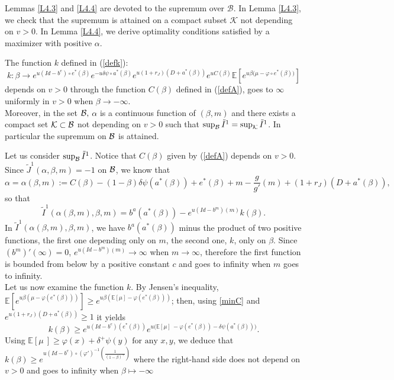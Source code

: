 \documentclass{svjour3}
\begin{document}
\noindent Lemmas \ref{L4.3} and \ref{L4.4} are devoted to the supremum over $\mathcal{B}$. In Lemma  \ref{L4.3}, we check that the supremum is attained on a compact subset $\mathcal{K}$ not depending on $v>0$. In Lemma \ref{L4.4}, we derive optimality  conditions satisfied by a maximizer with positive $\alpha$. 
\begin{lemma}
\label{L4.3}
The function $k$
defined in (\ref{defk}):
$$k:\beta\to e^{u(Id-b^e)\circ e^*(\beta)}   e^{-u \delta \psi \circ a^*(\beta)}e^{u(1+r_J)(D+a^*(\beta))}   e^{uC(\beta)}\mathbb{E}\left[e^{u\beta\big(\mu-\varphi\circ e^*(\beta)\big)}\right]$$
 depends on $v>0$ through the function $C(\beta)$ defined in (\ref{defA}), goes to $\infty$ uniformly in $v>0$ when $\beta\to-\infty$.
 \\
 Moreover, in the set ${\cal B},$  $\alpha$ is a 
 continuous function of $(\beta,m)$ and there exists a compact set ${\cal K}\subset{\cal B}$
 not depending on $v>0$ such that $\sup_{{\cal B}}\tilde I^1=\sup_{{\cal K}}\tilde I^1$. In particular 
 the supremum on ${\cal B}$ is attained.
\end{lemma}
\proof
 Let us consider $\sup_{{\cal B}}\tilde I^1$. Notice that $C(\beta)$ given by (\ref{defA}) depends on $v>0$. Since $\tilde J^1(\alpha,\beta,m)=-1$ on ${\cal B}$, we know that
 $$\alpha=\alpha(\beta,m):=C(\beta)-(1-\beta)\delta\psi(a^*(\beta))+e^*(\beta)+m-\frac{g}{g'}(m)+(1+r_J)(D+a^*(\beta)),$$ so that
\begin{equation}
   \tilde I^1(\alpha(\beta,m),\beta,m)=b^a(a^*(\beta))-e^{u(Id-b^m)(m)} k(\beta).\label{i1albetm}
\end{equation}
In $\tilde I^1(\alpha(\beta,m),\beta,m)$, we have $b^a(a^*(\beta)) $ minus the product of two positive functions, the first one depending only on $m$, the second one, $k$, only on $\beta$. Since $(b^m)'(\infty)=0$,  $e^{u(Id-b^m)(m)}\to\infty$ when $m\to\infty$, therefore the first function is bounded from below by a positive constant $c$ and goes to infinity when $m$ goes to infinity. 
\\
 Let us now examine the function $k$. By Jensen's inequality, ${\mathbb{E}}\left[e^{u\beta(\mu-\varphi(e^*(\beta)))}\right]\geq e^{u\beta({\mathbb{E}}[\mu]-\varphi(e^*(\beta)))}$; then, using \eqref{minC} and $e^{u(1+r_J)(D+a^*(\beta))}\geq 1$ it yields
$$
k(\beta)\geq e^{u(Id-b^e)(e^*(\beta))}
e^{u\Big(\mathbb{E}[\mu]~-\varphi(e^*(\beta))-\delta \psi(a^*(\beta))  \Big)}.
$$
\noindent 
Using $\mathbb{E}\left[\mu~\right]\geq \varphi(x)+\delta^+ \psi(y)\mbox{ for any }x,y$, we deduce that
 $k(\beta)\geq e^{u(Id-b^e)\circ(\varphi')^{-1}(\frac{1}{(1-\beta)^+})}$ where the right-hand side does not depend on $v>0$ and goes to infinity when $\beta\mapsto-\infty$
\end{document}

